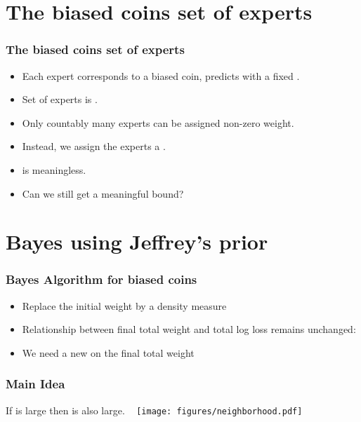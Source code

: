 \documentclass[handout]{beamer}
\begin{document}
\section{The biased coins set of experts}
\begin{frame}
\frametitle{The biased coins set of experts}
\begin{itemize}
\item Each expert corresponds to a biased coin, predicts with a fixed \R{$\theta \in [0,1]$}.
\item Set of experts is .
\item Only countably many experts can be assigned non-zero weight.
\item Instead, we assign the experts a .
\item {} is meaningless.
\item Can we still get a meaningful bound?
\end{itemize}
\end{frame}

\section{Bayes using Jeffrey's prior}

\begin{frame}
\frametitle{Bayes Algorithm for biased coins}
\begin{itemize}
\item 
Replace the initial weight by a density measure 
\item 
Relationship between final total weight and total log loss remains unchanged:
\R{\[
 \TAloss = \ln \int_0^1 \dweight{\theta}{} e^{-\TEloss{\theta}^{T+1}} d\theta
\]}
\item
We need a new  on the final total weight
\end{itemize}
\end{frame}

 \begin{frame}
\frametitle{Main Idea}
If  is large then  is also large.
~\pause
\texttt{[image: figures/neighborhood.pdf]}
\end{frame}
\end{document}
